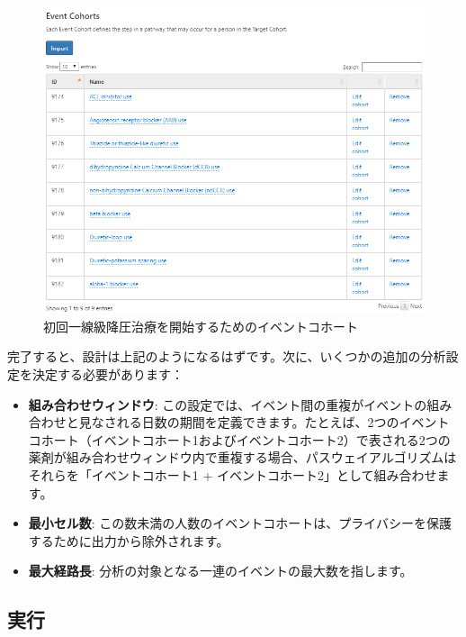 \documentclass[
  11pt]{book}
\providecommand{\tightlist}{%
  \setlength{\itemsep}{0pt}\setlength{\parskip}{0pt}}
\theoremstyle{definition}
\theoremstyle{definition}
\theoremstyle{definition}
\theoremstyle{definition}
\theoremstyle{remark}
\begin{document}
\begin{figure}

{\centering \includegraphics[width=1\linewidth]{images/Characterization/atlasPathwaysEventCohorts} 

}

\caption{初回一線級降圧治療を開始するためのイベントコホート}\label{fig:atlasPathwaysEventCohorts}
\end{figure}

完了すると、設計は上記のようになるはずです。次に、いくつかの追加の分析設定を決定する必要があります：

\begin{itemize}
\tightlist
\item
  \textbf{組み合わせウィンドウ}: この設定では、イベント間の重複がイベントの組み合わせと見なされる日数の期間を定義できます。たとえば、2つのイベントコホート（イベントコホート1およびイベントコホート2）で表される2つの薬剤が組み合わせウィンドウ内で重複する場合、パスウェイアルゴリズムはそれらを「イベントコホート1 + イベントコホート2」として組み合わせます。
\item
  \textbf{最小セル数}: この数未満の人数のイベントコホートは、プライバシーを保護するために出力から除外されます。
\item
  \textbf{最大経路長}: 分析の対象となる一連のイベントの最大数を指します。
\end{itemize}

\subsection{実行}\label{ux5b9fux884c-1}
\end{document}
